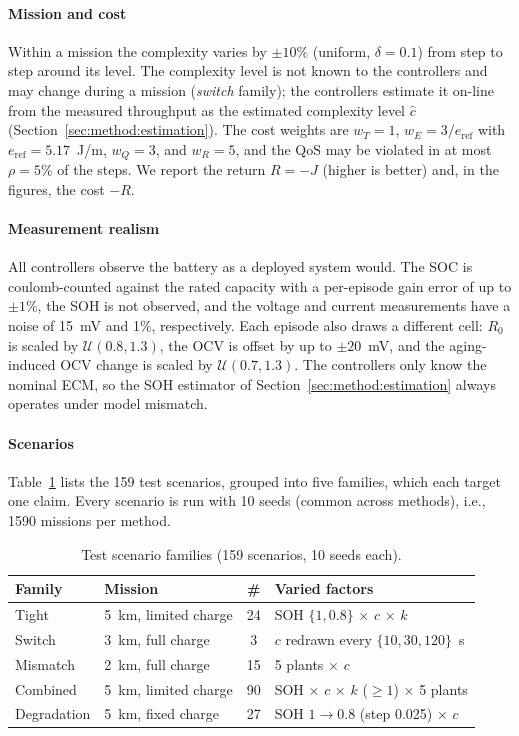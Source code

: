\paragraph{Mission and cost} Within a mission the complexity
varies by $\pm 10\%$ (uniform, $\delta = 0.1$) from step to step around its level.
The complexity level is not known to the controllers and may change during a mission
(\emph{switch} family); the controllers estimate it on-line from the measured throughput as the
estimated complexity level $\hat c$ (Section~\ref{sec:method:estimation}).
The cost weights are $w_T = 1$, $w_E = 3/e_{\mathrm{ref}}$ with $e_{\mathrm{ref}} = 5.17$~J/m,
$w_Q = 3$, and $w_R = 5$, and the \ac{QoS} may be violated in at most $\rho = 5\%$ of the steps.
We report the return $R = -J$ (higher is better) and, in the figures, the cost $-R$.

\paragraph{Measurement realism}
All controllers observe the battery as a deployed system would. The \ac{SOC} is coulomb-counted
against the rated capacity with a per-episode gain error of up to $\pm 1\%$, the \ac{SOH} is not
observed, and the voltage and current measurements have a noise of 15~mV and 1\%, respectively.
Each episode also draws a different cell: $R_0$ is scaled by $\mathcal{U}(0.8, 1.3)$, the \ac{OCV}
is offset by up to $\pm 20$~mV, and the aging-induced \ac{OCV} change is scaled by
$\mathcal{U}(0.7, 1.3)$. The controllers only know the nominal \ac{ECM}, so the \ac{SOH}
estimator of Section~\ref{sec:method:estimation} always operates under model mismatch.

\paragraph{Scenarios}
Table~\ref{tab:scenarios} lists the 159 test scenarios, grouped into five families, which
each target one claim. Every scenario is run with 10 seeds (common across methods), i.e.,
1590 missions per method.

\begin{table}[t]
\centering
\caption{Test scenario families (159 scenarios, 10 seeds each).}
\label{tab:scenarios}
\small
\begin{tabular}{@{}llcl@{}}
\toprule
Family & Mission & \# & Varied factors \\
\midrule
Tight          & 5~km, limited charge & 24 & \ac{SOH} $\{1, 0.8\}$ $\times$ $c$ $\times$ $k$ \\
Switch         & 3~km, full charge & 3  & $c$ redrawn every $\{10, 30, 120\}$~s \\
Mismatch       & 2~km, full charge & 15 & 5 plants $\times$ $c$ \\
Combined       & 5~km, limited charge & 90 & \ac{SOH} $\times$ $c$ $\times$ $k$ ($\geq 1$) $\times$ 5 plants \\
Degradation    & 5~km, fixed charge & 27 & \ac{SOH} $1 \to 0.8$ (step 0.025) $\times$ $c$ \\
\bottomrule
\end{tabular}
\end{table}


